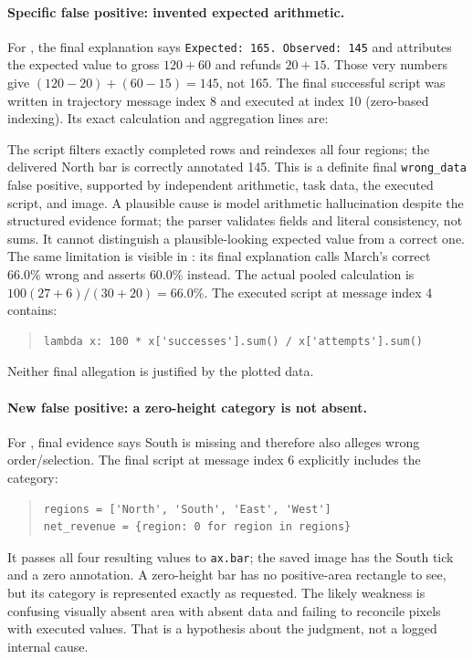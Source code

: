 \documentclass[11pt]{article}
\begin{document}
\paragraph{Specific false positive: invented expected arithmetic.}
For , the final explanation says
\texttt{Expected: 165. Observed: 145} and attributes the expected value
to gross $120+60$ and refunds $20+15$.
Those very numbers give $(120-20)+(60-15)=145$, not 165.
The final successful script was written in trajectory message index 8
and executed at index 10 (zero-based indexing). Its exact calculation
and aggregation lines are:
\begin{quote}
\small\ttfamily\raggedright
\noindent{}\par
\noindent{}
\end{quote}
The script filters exactly completed rows and reindexes all four regions;
the delivered North bar is correctly annotated 145. This is a definite
final \texttt{wrong\_data} false positive, supported by independent
arithmetic, task data, the executed script, and image. A plausible cause
is model arithmetic hallucination despite the structured evidence
format; the parser validates fields and literal consistency, not sums.
It cannot distinguish a plausible-looking expected value from a correct
one. The same limitation is visible in
: its final explanation calls
March's correct $66.0\%$ wrong and asserts $60.0\%$ instead.
The actual pooled calculation is
$100(27+6)/(30+20)=66.0\%$.
The executed script at message index 4 contains:
\begin{quote}
\small
\begin{verbatim}
lambda x: 100 * x['successes'].sum() / x['attempts'].sum()
\end{verbatim}
\end{quote}
Neither final allegation is justified by the plotted data.

\paragraph{New false positive: a zero-height category is not absent.}
For , final evidence says South is
missing and therefore also alleges wrong order/selection.
The final script at message index 6 explicitly includes the category:
\begin{quote}
\small
\begin{verbatim}
regions = ['North', 'South', 'East', 'West']
net_revenue = {region: 0 for region in regions}
\end{verbatim}
\end{quote}
It passes all four resulting values to \texttt{ax.bar}; the saved image
has the South tick and a zero annotation. A zero-height bar has no
positive-area rectangle to see, but its category is represented exactly
as requested. The likely weakness is confusing visually absent area
with absent data and failing to reconcile pixels with executed values.
That is a hypothesis about the judgment, not a logged internal cause.
\end{document}
